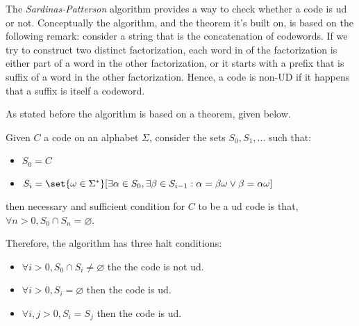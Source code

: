 \documentclass{subfiles}
\begin{document}
    The \emph{Sardinas-Patterson} algorithm provides a way to check whether a code is \gls{ud} or not. 
        Conceptually the algorithm, and the theorem it's built on,
        is based on the following remark: 
        consider a string that is the concatenation of codewords.
        If we try to construct two distinct factorization, 
        each word in of the factorization is either 
        \textcolor{rpIris}{part of a word in the other factorization,
        or it starts with a prefix that is suffix of a word in the other factorization}.
        Hence, a code is non-UD if it happens that a suffix is itself a codeword.

    As stated before the algorithm is based on a theorem, given below.
    \begin{theorem}\label{Thm:1}
        Given \(C\) a code on an alphabet \(\Sigma\), 
            consider the sets \(S_{0}, S_{1}, \ldots\) such that:
            \begin{itemize}
                \item \(S_{0} = C\)
                \item \(S_{i} = \set{\omega \in \Sigma^{*}}[
                    \exists \alpha \in S_{0}, \exists \beta \in S_{i - 1} : 
                    \alpha = \beta \omega \lor \beta = \alpha \omega
                ]\)
            \end{itemize}
            then necessary and sufficient condition for \(C\) to be a \gls{ud} code is that,
            \(\forall n > 0, S_{0} \cap S_{n} = \varnothing\).
    \end{theorem}
    Therefore, the algorithm has three halt conditions:
    \begin{itemize}
        \item \(\forall i > 0,  S_{0} \cap S_{i} \neq \varnothing\) the the code is not \gls{ud}.
        \item \(\forall i > 0, S_{i} = \varnothing\) then the code is \gls{ud}.
        \item \(\forall i, j > 0, S_{i} = S_{j}\) then the code is \gls{ud}.
    \end{itemize}
\end{document}
